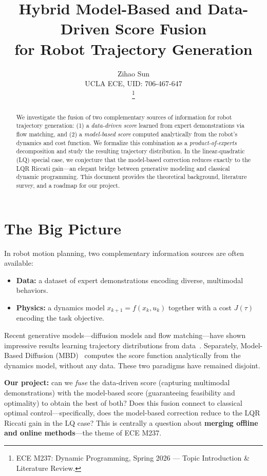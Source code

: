 \documentclass[letterpaper, 10pt, conference]{ieeeconf}
\title{\LARGE \bf
Hybrid Model-Based and Data-Driven Score Fusion\\
for Robot Trajectory Generation}
\author{%
  \parbox{3in}{\centering Zihao Sun\\
               UCLA ECE, UID: 706-467-647}
  \thanks{ECE M237: Dynamic Programming, Spring 2026 --- Topic Introduction \& Literature Review.}
}
\begin{document}
\maketitle

\begin{abstract}
We investigate the fusion of two complementary sources of information for robot
trajectory generation: (1) a \emph{data-driven score} learned from expert
demonstrations via flow matching, and (2) a \emph{model-based score} computed
analytically from the robot's dynamics and cost function.  We formalize this
combination as a \emph{product-of-experts} decomposition and study the resulting
trajectory distribution.  In the linear-quadratic (LQ) special case, we conjecture
that the model-based correction reduces exactly to the LQR Riccati gain---an
elegant bridge between generative modeling and classical dynamic programming.
This document provides the theoretical background, literature survey, and a
roadmap for our project.
\end{abstract}

\section{The Big Picture}
\label{sec:bigpicture}

In robot motion planning, two complementary information sources are often available:
\begin{itemize}[leftmargin=*]
  \item \textbf{Data:} a dataset of expert demonstrations encoding diverse,
        multimodal behaviors.
  \item \textbf{Physics:} a dynamics model $x_{k+1} = f(x_k, u_k)$ together
        with a cost $J(\tau)$ encoding the task objective.
\end{itemize}
Recent generative models---diffusion models and flow matching---have shown
impressive results learning trajectory distributions from data~\cite{janner2022,chi2023diffusionpolicy}.
Separately, Model-Based Diffusion (MBD)~\cite{mbd} computes the score
function analytically from the dynamics model, without any data.  These two
paradigms have remained disjoint.

\textbf{Our project:} can we \emph{fuse} the data-driven score (capturing
multimodal demonstrations) with the model-based score (guaranteeing feasibility
and optimality) to obtain the best of both?  Does this fusion connect to
classical optimal control---specifically, does the model-based correction
reduce to the LQR Riccati gain in the LQ case?  This is centrally a question
about \textbf{merging offline and online methods}---the theme of ECE M237.
\end{document}
